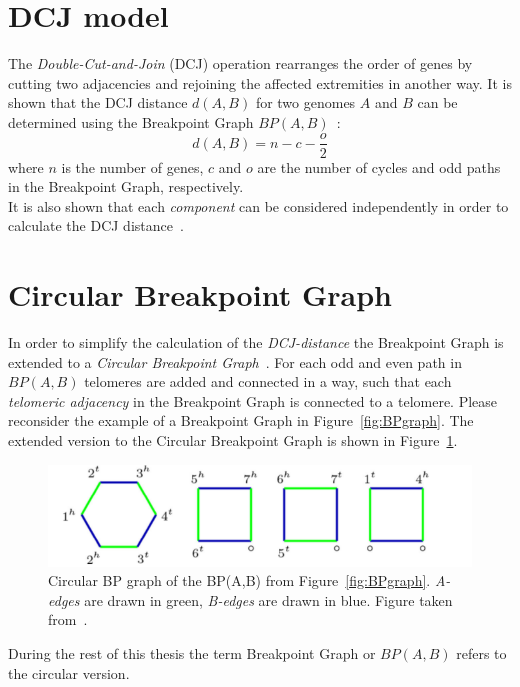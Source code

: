 
\section{DCJ model} %
\label{sub:dcj_model}
The \emph{Double-Cut-and-Join} (DCJ) operation rearranges the order of genes by cutting two adjacencies and rejoining the affected extremities
in another way.
It is shown that the DCJ distance $d(A,B)$ for two genomes $A$ and $B$ can be determined using the Breakpoint Graph $BP(A,B)$~\cite{Bergeron2006}:
\[
	d(A,B) = n - c - \frac{o}{2}
\]
where $n$ is the number of genes, $c$ and $o$ are the number of cycles and odd paths in the Breakpoint Graph, respectively.\\
It is also shown that each \emph{component} can be considered independently in order to calculate the DCJ distance~\cite{Stoye2010}.\\


\section{Circular Breakpoint Graph} %
\label{sub:circular_breakpoint_graph}
In order to simplify the calculation of the \emph{DCJ-distance} the Breakpoint Graph is extended to a \emph{Circular Breakpoint Graph}~\cite{Feijao2015}.
For each odd and even path in $BP(A,B)$ telomeres are added and connected in a way, such that each \emph{telomeric adjacency} in the Breakpoint Graph
is connected to a telomere. Please reconsider the example of a Breakpoint Graph in Figure~\ref{fig:BPgraph}.
The extended version to the Circular Breakpoint Graph is shown in Figure~\ref{fig:cBPgraph}.

\begin{figure}[h]
	\centering
	\includegraphics[scale=0.5]{figures/cBPG.png}
	\caption{%
	 Circular BP graph of the BP(A,B) from Figure~\ref{fig:BPgraph}. \emph{A-edges} are drawn in green, \emph{B-edges} are drawn in blue.
	 Figure taken from~\cite{Feijao2015}.
	}%
	\label{fig:cBPgraph}
\end{figure}

During the rest of this thesis the term Breakpoint Graph or $BP(A,B)$ refers to the circular version.